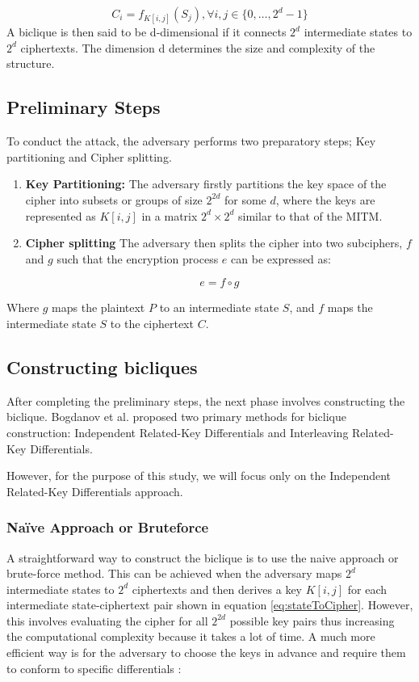 \documentclass{report}
\begin{document}
\begin{equation}
C_i = f_{K[i, j]}(S_j), \forall i, j \in \{0, \ldots, 2^d - 1\}
\end{equation}
A biclique is then said to be d-dimensional if it connects $2^d$ intermediate states to $2^d$ ciphertexts. The dimension d determines the size and complexity of the structure. 

\subsection{Preliminary Steps}
To conduct the attack, the adversary performs two preparatory steps; Key partitioning and Cipher splitting.

\begin{enumerate}
    \item \textbf{Key Partitioning:}
    The adversary firstly partitions the key space of the cipher into subsets or groups of size $2^{2d}$ for some $d$, where the keys are represented as $K[i, j]$ in a matrix $2^d \times 2^d$ similar to that of the MITM\cite{bogdanov2011biclique}.

    \item \textbf{Cipher splitting}
    The adversary then splits the cipher into two subciphers, $f$ and $g$ such that the encryption process $e$ can be expressed as:
    
    \begin{equation}
        e = f \circ g
    \end{equation}
    
\end{enumerate}
Where $g$ maps the plaintext $P$ to an intermediate state $S$, and $f$ maps the intermediate state $S$ to the ciphertext $C$\cite{bogdanov2011biclique}.


\subsection{Constructing bicliques}
\label{sec:constructing_bicliques}
After completing the preliminary steps, the next phase involves constructing the biclique. Bogdanov et al. proposed two primary methods for biclique construction: Independent Related-Key Differentials and Interleaving Related-Key Differentials.

However, for the purpose of this study, we will focus only on the Independent Related-Key Differentials approach.

\subsubsection{Naïve Approach or Bruteforce}
A straightforward way to construct the biclique is to use the naive approach or brute-force method. This can be achieved when the adversary maps $2^d$ intermediate states to $2^d$ ciphertexts and then derives a key $K[i, j]$ for each intermediate state-ciphertext pair shown in equation \eqref{eq:stateToCipher}. However, this involves evaluating the cipher for all $2^{2d}$ possible key pairs thus increasing the computational complexity because it takes a lot of time. A much more efficient way is for the adversary to choose the keys in advance and require them to conform to specific differentials \cite{bogdanov2011biclique}:
\end{document}
